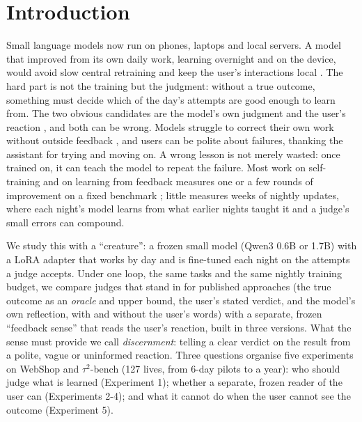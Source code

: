 \section{Introduction}

Small language models now run on phones, laptops and local servers. A model that improved from its own daily work, learning overnight and on the device, would avoid slow central retraining and keep the user's interactions local \cite{liu2024mobilellm, zhu2023pockengine, zheng2025review}. The hard part is not the training but the judgment: without a true outcome, something must decide which of the day's attempts are good enough to learn from. The two obvious candidates are the model's own judgment \cite{yuan2024selfrewarding} and the user's reaction \cite{hancock2019learning, shi2026wildfeedback}, and both can be wrong. Models struggle to correct their own work without outside feedback \cite{huang2024large}, and users can be polite about failures, thanking the assistant for trying and moving on. A wrong lesson is not merely wasted: once trained on, it can teach the model to repeat the failure. Most work on self-training and on learning from feedback measures one or a few rounds of improvement on a fixed benchmark \cite{zelikman2022star, singh2024beyond, yuan2024selfrewarding}; little measures weeks of nightly updates, where each night's model learns from what earlier nights taught it and a judge's small errors can compound.

We study this with a ``creature'': a frozen small model (Qwen3 0.6B or 1.7B) with a LoRA adapter that works by day and is fine-tuned each night on the attempts a judge accepts. Under one loop, the same tasks and the same nightly training budget, we compare judges that stand in for published approaches (the true outcome as an \emph{oracle} and upper bound, the user's stated verdict, and the model's own reflection, with and without the user's words) with a separate, frozen ``feedback sense'' that reads the user's reaction, built in three versions. What the sense must provide we call \emph{discernment}: telling a clear verdict on the result from a polite, vague or uninformed reaction. Three questions organise five experiments on WebShop \cite{yao2022webshop} and $\tau^2$-bench \cite{barres2026tau2} (127 lives, from 6-day pilots to a year): who should judge what is learned (Experiment 1); whether a separate, frozen reader of the user can (Experiments 2-4); and what it cannot do when the user cannot see the outcome (Experiment 5).


